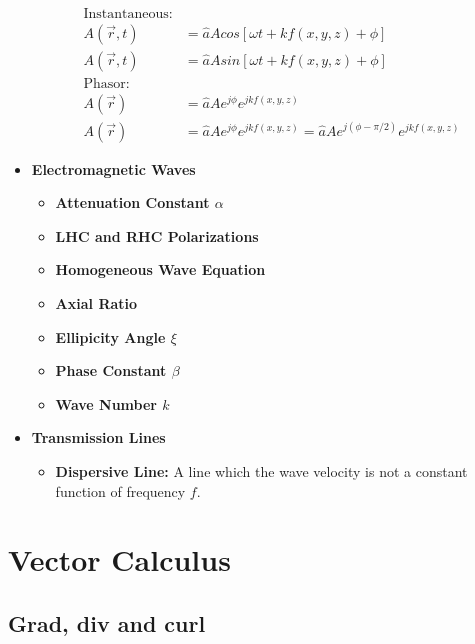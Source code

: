 \documentclass{book}
\begin{document}
\begin{itemize}
	\begin{align*}
		\text{Instantaneous:}& \\
		A(\vec{r}, t) &= \hat{a} A cos[\omega t + kf(x,y,z) + \phi]  \\
		A(\vec{r}, t) &= \hat{a} Asin[\omega t + kf(x,y,z) + \phi] \\
		\text{Phasor:}&\\
		A(\vec{r}) &= \hat{a} A e^{j\phi} e^{jkf(x,y,z)} \\
		A(\vec{r}) &= \hat{a} Ae ^{j\phi} e^{jkf(x,y,z)} = \hat{a} Ae^{j(\phi - \pi / 2)}e^{jkf(x,y,z)}
	\end{align*}
	\item \textbf{Electromagnetic Waves}
	\begin{itemize}
		\item \textbf{Attenuation Constant $\alpha$}
		\item \textbf{LHC and RHC Polarizations}
		\item \textbf{Homogeneous Wave Equation}
		\item \textbf{Axial Ratio}
		\item \textbf{Ellipicity Angle $\xi$}
		\item \textbf{Phase Constant $\beta$}
		\item \textbf{Wave Number $k$}
	\end{itemize}
	\item \textbf{Transmission Lines}
	\begin{itemize}
		\item \textbf{Dispersive Line:} A line which the wave velocity is not a constant function of frequency $f$.
	\end{itemize}
\end{itemize}



\section{Vector Calculus}


\subsection{Grad, div and curl}
\end{document}
